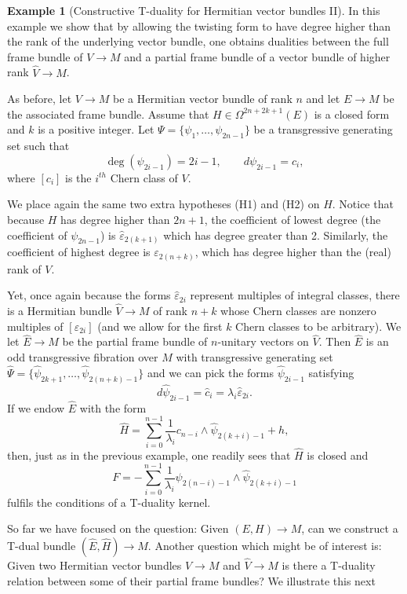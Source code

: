 \documentclass[12pt,twoside]{article}
\theoremstyle{plain}
\theoremstyle{definition}
\newtheorem{example}[theorem]{Example}
\numberwithin{equation}{section}
\begin{document}
\begin{example}[Constructive T-duality for Hermitian vector bundles II]\label{ex:constructive 2}   In this example we show that by allowing the twisting form to have degree higher than the rank of the underlying vector bundle, one obtains dualities between the full frame bundle of $V\to M$ and a partial frame bundle of a vector bundle of higher rank $\hat{V}\to M$.
  
As before,  let $V\to M$ be a Hermitian vector bundle of rank $n$ and let $E\to M$ be the associated frame bundle. Assume that $H \in \Omega^{2n+2k+1}(E)$ is a closed form and $k$ is a positive integer. Let $\Psi = \{\psi_1,\dots,\psi_{2n-1}\}$ be a transgressive generating set such that
\[\deg(\psi_{2i-1}) = 2i-1, \qquad d\psi_{2i-1} = c_i,\]
where $[c_i]$ is the $i^{th}$ Chern class of $V$.

We place again the same two extra hypotheses (H1) and (H2) on $H$. Notice that because $H$ has degree higher than $2n+1$, the coefficient of lowest degree (the coefficient of $\psi_{2n-1}$) is $\hat\varepsilon_{2(k+1)}$ which has degree greater than 2.  Similarly, the coefficient of highest degree is $\varepsilon_{2(n+k)}$, which has degree higher than the (real) rank of $V$.

Yet, once again because the forms $\hat\varepsilon_{2i}$ represent multiples of integral classes, there is a Hermitian bundle $\hat{V}\to M$ of rank $n+k$ whose Chern classes are nonzero multiples of $[\varepsilon_{2i}]$ (and we allow for the first $k$ Chern classes to be arbitrary).  We let $\hat{E}\to M$ be the partial frame bundle of $n$-unitary vectors on $\hat{V}$. Then $\hat{E}$ is an odd transgressive fibration over $M$ with transgressive generating set $\hat{\Psi} = \{\hat{\psi}_{2k+1},\dots,\hat{\psi}_{2(n+k)-1}\}$ and we can pick the forms $\hat\psi_{2i-1}$ satisfying
\[d\hat\psi_{2i-1} = \hat{c}_i= \lambda_i \hat\varepsilon_{2i}.\]
If we endow $\hat{E}$ with the form
\[\hat{H} = \sum_{i=0}^{n-1} \frac{1}{\lambda_i}c_{n-i} \wedge \hat{\psi}_{2(k+i)-1} + h,\]
then, just as in the previous example, one readily sees that $\hat{H}$ is closed and
\[F = -\sum_{i=0}^{n-1} \frac{1}{\lambda_i}\psi_{2(n-i)-1}\wedge \hat{\psi}_{2(k+i)-1}  \]
fulfils the conditions of a T-duality kernel.
\end{example}

So far we have focused on the question: Given $(E,H)\to M$, can we construct a T-dual bundle $(\hat{E},\hat{H})\to M$. Another question which might be of interest is: Given two Hermitian vector bundles $V\to M$ and $\hat{V}\to M$ is there a T-duality relation between some of their partial frame bundles? We illustrate this next   
\end{document}
